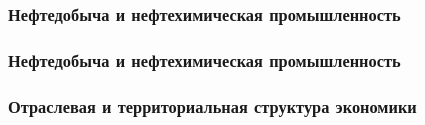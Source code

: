 \begin{frame}
\frametitle{Нефтедобыча и нефтехимическая промышленность}


\end{frame}

\begin{frame}
\frametitle{Нефтедобыча и нефтехимическая промышленность}


\end{frame}

\begin{frame}
\frametitle{Отраслевая и территориальная структура экономики}


\end{frame}
